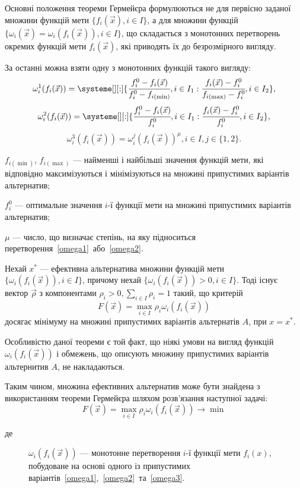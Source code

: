 Основні положення теореми Гермейєра формулюються не для первісно заданої множини функцій мети $\{f_i(\vec{x}),i \in I\}$, а для множини функцій $\{\omega_i(\vec{x})=\omega_i(f_i(\vec{x})), i \in I\}$, що складається з монотонних перетворень окремих функцій мети $f_i(\vec{x})$, які приводять їх до безрозмірного вигляду.

За останні можна взяти одну з монотонних функцій такого вигляду:
\begin{equation}\label{omega1}
\omega^1_i(f_i(\vec{x})) = \systeme[][:]{
\cfrac{f_i^0-f_i(\vec{x})}{f_i^0 - f_{i(\min)}},i \in I_1
:
\cfrac{f_i(\vec{x})-f_i^0}{f_{i(\max)} - f_i^0},i \in I_2
}
,
\end{equation}
\begin{equation}\label{omega2}
\omega^2_i(f_i(\vec{x})) = \systeme[][:]{
\cfrac{f_i^0-f_i(\vec{x})}{f_i^0},i \in I_1
:
\cfrac{f_i(\vec{x})-f_i^0}{f_i^0},i \in I_2
}
,
\end{equation}
\begin{equation}\label{omega3}
\omega^3_i(f_i(\vec{x}))=\omega^j_i(f_i(\vec{x}))^\mu, i \in I, j \in \{1,2\}
.
\end{equation}
\begin{description}
	\item[де] $f_{i(\min)}$, $f_{i(\max)}$ --- найменші і найбільші значення функцій мети, які відповідно максимізуються і мінімізуються на множині припустимих варіантів альтернатив;
	\item $f_i^0$ --- оптимальне значення $i$-ї функції мети на множині припустимих варіантів альтернатив;
	\item $\mu$ --- число, що визначає степінь, на яку підноситься перетворення~\eqref{omega1}~або~\eqref{omega2}.
\end{description}

Нехай $x^*$ --- ефективна альтернатива множини функцій мети $\{\omega_i(f_i(\vec{x})), i \in I\}$, причому нехай $\{\omega_i(f_i(\vec{x}))>0, i \in I\}$. 
Тоді існує вектор $\vec{\rho}$ з компонентами $\rho_i > 0, \sum_{i \in I}\rho_i=1$ такий, що критерій 
\[
F(\vec{x})=\max_{i \in I} \rho_i \omega_i(f_i(\vec{x}))
\]
досягає мінімуму на множині припустимих варіантів альтернатів $A$, при $x=x^*$.

Особливістю даної теореми є той факт, що ніякі умови на вигляд функцій $\omega_i(f_i(\vec{x}))$ і обмежень, що описують множину припустимих варіантів альтернитив $A$, не накладаються.

Таким чином, множина ефективних альтернатив може бути знайдена з використанням теореми Гермейєра шляхом розв'язання наступної задачі:
\[
F(\vec{x})=\max_{i \in I} \rho_i\omega_i(f_i(\vec{x})) \to \min
\]
\begin{description}
    \item[де] $\omega_i(f_i(\vec{x}))$ --- монотонне перетворення $i$-ї функції мети $f_i(x)$, побудоване на основі одного із припустимих варіантів~\eqref{omega1},~\eqref{omega2}~та~\eqref{omega3}.
\end{description}

